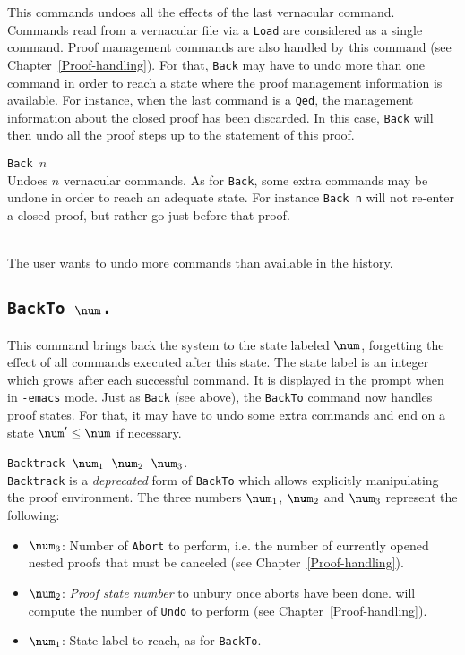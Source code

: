 This commands undoes all the effects of the last vernacular
command. Commands read from a vernacular file via a {\tt Load} are
considered as a single command. Proof management commands
are also handled by this command (see Chapter~\ref{Proof-handling}).
For that, {\tt Back} may have to undo more than one command in order
to reach a state where the proof management information is available.
For instance, when the last command is a {\tt Qed}, the management
information about the closed proof has been discarded. In this case,
{\tt Back} will then undo all the proof steps up to the statement of
this proof.

\begin{Variants}
\item {\tt Back $n$} \\
  Undoes $n$ vernacular commands. As for {\tt Back}, some extra
  commands may be undone in order to reach an adequate state.
  For instance {\tt Back n} will not re-enter a closed proof,
  but rather go just before that proof.
\end{Variants}

\begin{ErrMsgs}
\item {} \\
  The user wants to undo more commands than available in the history.
\end{ErrMsgs}

\subsection[\tt BackTo $\num$.]{\tt BackTo $\num$.}
\label{sec:statenums}

This command brings back the system to the state labeled $\num$,
forgetting the effect of all commands executed after this state.
The state label is an integer which grows after each successful command.
It is displayed in the prompt when in \texttt{-emacs} mode.
Just as {\tt Back} (see above), the {\tt BackTo} command now handles
proof states. For that, it may have to undo some
extra commands and end on a state $\num' \leq \num$ if necessary.

\begin{Variants}
\item {\tt Backtrack $\num_1$ $\num_2$ $\num_3$}.\\
  {\tt Backtrack} is a \emph{deprecated} form of {\tt BackTo} which
  allows explicitly manipulating the proof environment. The three
  numbers $\num_1$, $\num_2$ and $\num_3$ represent the following:
\begin{itemize}
\item $\num_3$: Number of \texttt{Abort} to perform, i.e. the number
  of currently opened nested proofs that must be canceled (see
  Chapter~\ref{Proof-handling}).
\item $\num_2$: \emph{Proof state number} to unbury once aborts have
  been done. {\Coq} will compute the number of \texttt{Undo} to perform
  (see Chapter~\ref{Proof-handling}).
\item $\num_1$: State label to reach, as for {\tt BackTo}.
\end{itemize}
\end{Variants}

